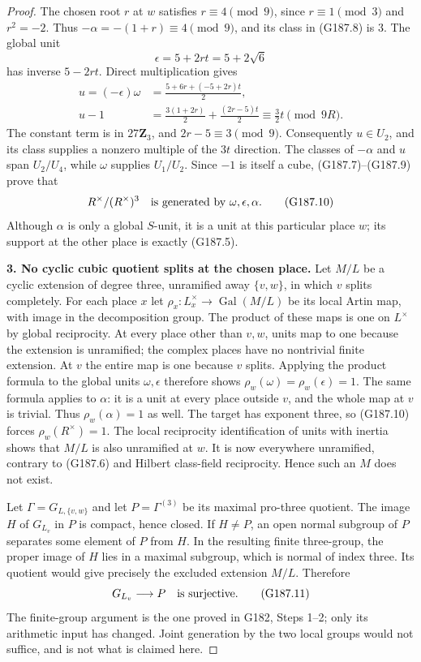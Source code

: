 \begin{proof}
The chosen root $r$ at $w$ satisfies $r\equiv4\pmod9$, since
$r\equiv1\pmod3$ and $r^2=-2$.  Thus
$-\alpha=-(1+r)\equiv4\pmod9$, and its class in (G187.8) is $3$.
The global unit
\[
                     \epsilon=5+2rt=5+2\sqrt6
\]
has inverse $5-2rt$.  Direct multiplication gives
\[
 \begin{split}
 u=(-\epsilon)\omega
   &=\frac{5+6r+(-5+2r)t}{2},\\
 u-1&=\frac{3(1+2r)}2+\frac{(2r-5)t}{2}
           \equiv\frac32t\pmod{9R}.
 \end{split}                                            \tag{G187.9}
\]
The constant term is in $27\mathbf Z_3$, and $2r-5\equiv3\pmod9$.
Consequently $u\in U_2$, and its class supplies a nonzero multiple
of the $3t$ direction.  The classes of $-\alpha$ and $u$ span
$U_2/U_4$, while $\omega$ supplies $U_1/U_2$.  Since $-1$ is itself
a cube, (G187.7)--(G187.9) prove that
\[
 R^\times/(R^\times)^3
       \quad\hbox{is generated by }\omega,\epsilon,\alpha.
                                                        \tag{G187.10}
\]
Although $\alpha$ is only a global $S$-unit, it is a unit at this
particular place $w$; its support at the other place is exactly (G187.5).

\textbf{3. No cyclic cubic quotient splits at the chosen place.}
Let $M/L$ be a cyclic extension of degree three, unramified away
$\{v,w\}$, in which $v$ splits completely.  For each place $x$ let
$\rho_x:L_x^\times\to\operatorname{Gal}(M/L)$ be its local Artin map,
with image in the decomposition group.  The product of these maps
is one on $L^\times$ by global reciprocity.  At every place other
than $v,w$, units map to one because the extension is unramified;
the complex places have no nontrivial finite extension.  At $v$ the
entire map is one because $v$ splits.
Applying the product formula to the global units $\omega,\epsilon$
therefore shows $\rho_w(\omega)=\rho_w(\epsilon)=1$.
The same formula applies to $\alpha$: it is a unit at every place
outside $v$, and the whole map at $v$ is trivial.  Thus
$\rho_w(\alpha)=1$ as well.  The target has exponent three, so
(G187.10) forces $\rho_w(R^\times)=1$.
The local reciprocity identification of units with inertia shows
that $M/L$ is also unramified at $w$.  It is now everywhere unramified,
contrary to (G187.6) and Hilbert class-field reciprocity.  Hence such
an $M$ does not exist.

Let $\Gamma=G_{L,\{v,w\}}$ and let $P=\Gamma^{(3)}$ be its maximal
pro-three quotient.  The image $H$ of $G_{L_v}$ in $P$ is compact,
hence closed.  If $H\ne P$, an open normal subgroup of $P$ separates
some element of $P$ from $H$.  In the resulting finite three-group,
the proper image of $H$ lies in a maximal subgroup, which is normal
of index three.  Its quotient would give precisely the excluded
extension $M/L$.  Therefore
\[
                         G_{L_v}\longrightarrow P
                         \quad\hbox{is surjective}.    \tag{G187.11}
\]
The finite-group argument is the one proved in G182, Steps 1--2;
only its arithmetic input has changed.  Joint generation by the
two local groups would not suffice, and is not what is claimed here.


\end{proof}
